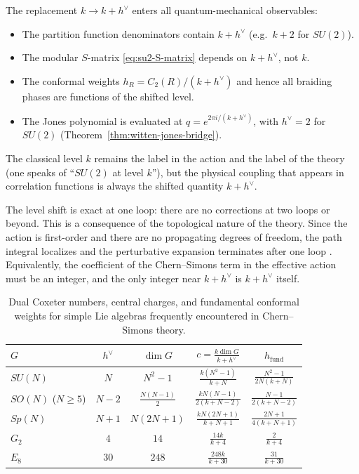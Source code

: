\begin{remark}\label{rem:appC-shift-consequences}
The replacement $k\to k+h^\vee$ enters all quantum-mechanical observables:
\begin{itemize}
\item The partition function denominators contain $k+h^\vee$ (e.g.\ $k+2$ for $SU(2)$).
\item The modular $S$-matrix \eqref{eq:su2-S-matrix} depends on $k+h^\vee$, not $k$.
\item The conformal weights $h_R = C_2(R)/(k+h^\vee)$ and hence all braiding phases are functions of the shifted level.
\item The Jones polynomial is evaluated at $q = e^{2\pi i/(k+h^\vee)}$, with $h^\vee = 2$ for $SU(2)$ (Theorem~\ref{thm:witten-jones-bridge}).
\end{itemize}
The classical level $k$ remains the label in the action and the label of the theory (one speaks of ``$SU(2)$ at level $k$''), but the physical coupling that appears in correlation functions is always the shifted quantity $k+h^\vee$.
\end{remark}

\begin{remark}\label{rem:appC-no-higher-loop}
The level shift is exact at one loop: there are no corrections at two loops or beyond. This is a consequence of the topological nature of the theory. Since the action is first-order and there are no propagating degrees of freedom, the path integral localizes and the perturbative expansion terminates after one loop \cite{BarNatan1995Perturbative}. Equivalently, the coefficient of the Chern--Simons term in the effective action must be an integer, and the only integer near $k+h^\vee$ is $k+h^\vee$ itself.
\end{remark}

\begin{table}[h]
\centering
\begin{tabular}{lcccc}
\toprule
$G$ & $h^\vee$ & $\dim G$ & $c = \frac{k\dim G}{k+h^\vee}$ & $h_{\mathrm{fund}}$ \\
\midrule
$SU(N)$ & $N$ & $N^2-1$ & $\frac{k(N^2-1)}{k+N}$ & $\frac{N^2-1}{2N(k+N)}$ \\[2mm]
$SO(N)$ ($N\geq 5$) & $N-2$ & $\frac{N(N-1)}{2}$ & $\frac{kN(N-1)}{2(k+N-2)}$ & $\frac{N-1}{2(k+N-2)}$ \\[2mm]
$Sp(N)$ & $N+1$ & $N(2N+1)$ & $\frac{kN(2N+1)}{k+N+1}$ & $\frac{2N+1}{4(k+N+1)}$ \\[2mm]
$G_2$ & $4$ & $14$ & $\frac{14k}{k+4}$ & $\frac{2}{k+4}$ \\[2mm]
$E_8$ & $30$ & $248$ & $\frac{248k}{k+30}$ & $\frac{31}{k+30}$ \\
\bottomrule
\end{tabular}
\caption{Dual Coxeter numbers, central charges, and fundamental conformal weights for simple Lie algebras frequently encountered in Chern--Simons theory.}
\label{tab:appC-dual-coxeter}
\end{table}
